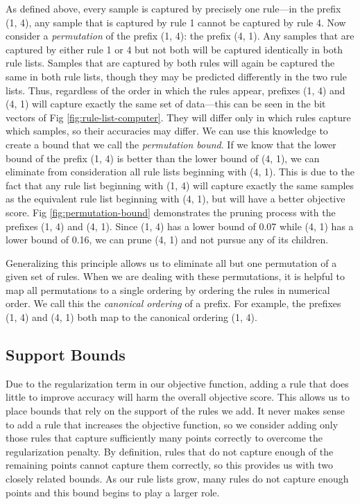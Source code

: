 As defined above, every sample is captured by precisely one rule---in the prefix (1, 4), any sample that is captured by rule 1 cannot be captured by rule 4. 
Now consider a \textit{permutation} of the prefix (1, 4): the prefix (4, 1).
Any samples that are captured by either rule 1 or 4 but not both will be captured identically in both rule lists.
Samples that are captured by both rules will again be captured the same in both rule lists, though they may be predicted differently in the two rule lists.
Thus, regardless of the order in which the rules appear, prefixes (1, 4) and (4, 1) will capture exactly the same set of data---this can be seen in the bit vectors of Fig \ref{fig:rule-list-computer}.
They will differ only in which rules capture which samples, so their accuracies may differ.
We can use this knowledge to create a bound that we call the \textit{permutation bound}.
If we know that the lower bound of the prefix (1, 4) is better than the lower bound of (4, 1), we can eliminate from consideration all rule lists beginning with (4, 1).
This is due to the fact that any rule list beginning with (1, 4) will capture exactly the same samples as the equivalent rule list beginning with (4, 1), but will have a better objective score.
Fig \ref{fig:permutation-bound} demonstrates the pruning process with the prefixes (1, 4) and (4, 1).
Since (1, 4) has a lower bound of 0.07 while (4, 1) has a lower bound of 0.16, we can prune (4, 1) and not pursue any of its children.

Generalizing this principle allows us to eliminate all but one permutation of a given set of rules.
When we are dealing with these permutations, it is helpful to map all permutations to a single ordering by ordering the rules in numerical order.
We call this the \textit{canonical ordering} of a prefix.
For example, the prefixes (1, 4) and (4, 1) both map to the canonical ordering (1, 4).

\subsection{Support Bounds}
Due to the regularization term in our objective function, adding a rule that does little to improve accuracy will harm the overall objective score.
This allows us to place bounds that rely on the support of the rules we add.
It never makes sense to add a rule that increases the objective function, so we consider adding only those rules that capture sufficiently many points correctly to overcome the regularization penalty.
By definition, rules that do not capture enough of the remaining points cannot capture them correctly, so this provides us with two closely related bounds.
As our rule lists grow, many rules do not capture enough points and this bound begins to play a larger role.

